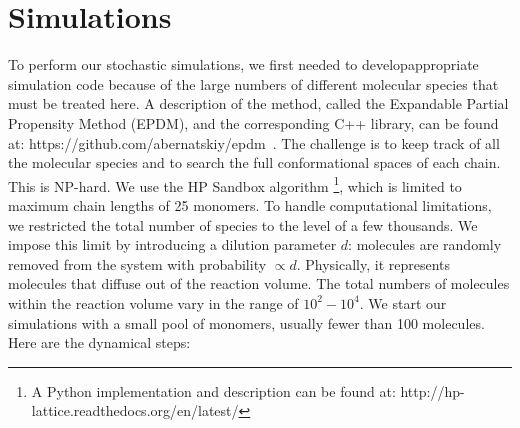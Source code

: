 \documentclass[5p,times]{elsarticle}
\begin{document}
 \section{Simulations}
To perform our stochastic simulations, we first needed to developappropriate simulation code 
because of the large numbers of different molecular species that must be treated here.  A 
description of the method, called the Expandable Partial Propensity Method (EPDM), and the 
corresponding C++ library, can be found at: 
https://github.com/abernatskiy/epdm~\cite{Guseva2016b}. 
The challenge is to keep track of all the molecular species and to search the full conformational 
spaces of each 
chain.  This is NP-hard.  We use the HP Sandbox algorithm\cite{lau1989lattice,Dill2008a} 
\footnote{A 
Python implementation and description can be found at: 
http://hp-lattice.readthedocs.org/en/latest/}, which is limited to maximum chain lengths of 25 
monomers.  To handle computational limitations, we restricted the total number of species to the 
level of a few thousands.  We impose this limit by introducing a dilution parameter $d$: molecules 
are randomly removed from the system with probability $\propto d$.  Physically, it represents 
molecules that diffuse out of the reaction volume.  The total numbers of molecules within the 
reaction volume vary in the range of $10^2-10^4$.  We start our simulations with a small pool of 
monomers, usually fewer than 100 molecules.  Here are the dynamical steps:
\end{document}
